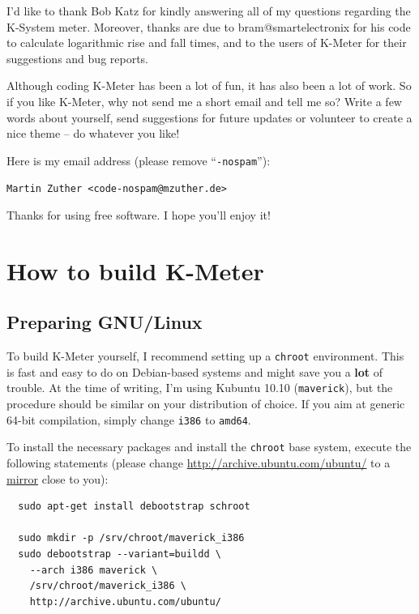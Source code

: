 I'd like to thank Bob Katz for kindly answering all of my questions
regarding the K-System meter.  Moreover, thanks are due to
bram@smartelectronix for his code to calculate logarithmic rise and
fall times, and to the users of K-Meter for their suggestions and bug
reports.

Although coding K-Meter has been a lot of fun, it has also been a lot
of work.  So if you like K-Meter, why not send me a short email and
tell me so?  Write a few words about yourself, send suggestions for
future updates or volunteer to create a nice theme -- do whatever you
like!

Here is my email address (please remove ``\texttt{-nospam}''):

\begin{center}
  \texttt{Martin Zuther <code-nospam@mzuther.de>}
\end{center}

Thanks for using free software.  I hope you'll enjoy it!

\appendix

\chapter{How to build K-Meter}

\section{Preparing GNU/Linux}

To build K-Meter yourself, I recommend setting up a \texttt{chroot}
environment.  This is fast and easy to do on Debian-based systems and
might save you a \textbf{lot} of trouble.  At the time of writing, I'm
using Kubuntu 10.10 (\texttt{maverick}), but the procedure should be
similar on your distribution of choice.  If you aim at generic 64-bit
compilation, simply change \texttt{i386} to \texttt{amd64}.

To install the necessary packages and install the \texttt{chroot} base
system, execute the following statements (please change
\url{http://archive.ubuntu.com/ubuntu/} to a
\href{http://launchpad.net/ubuntu/+archivemirrors}{mirror} close to
you):

\begin{verbatim}
  sudo apt-get install debootstrap schroot

  sudo mkdir -p /srv/chroot/maverick_i386
  sudo debootstrap --variant=buildd \
    --arch i386 maverick \
    /srv/chroot/maverick_i386 \
    http://archive.ubuntu.com/ubuntu/
\end{verbatim}

